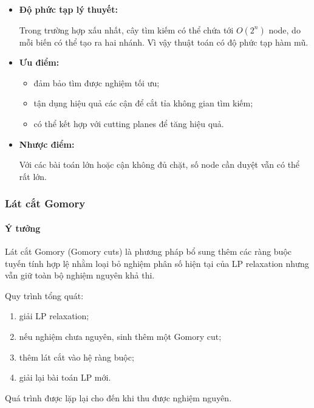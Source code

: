 \documentclass[fontsize=13pt,a4paper]{report}
\begin{document}
\begin{itemize}

  \item \textbf{Độ phức tạp lý thuyết:}

  Trong trường hợp xấu nhất, cây tìm kiếm có thể chứa tới \(O(2^n)\) node, do mỗi biến có thể tạo ra hai nhánh. Vì vậy thuật toán có độ phức tạp hàm mũ.

  \item \textbf{Ưu điểm:}

  \begin{itemize}
      \item đảm bảo tìm được nghiệm tối ưu;
      \item tận dụng hiệu quả các cận để cắt tỉa không gian tìm kiếm;
      \item có thể kết hợp với cutting planes để tăng hiệu quả.
  \end{itemize}

  \item \textbf{Nhược điểm:}

  Với các bài toán lớn hoặc cận không đủ chặt, số node cần duyệt vẫn có thể rất lớn.

\end{itemize}

\subsubsection{Lát cắt Gomory}

\paragraph{Ý tưởng}

Lát cắt Gomory (Gomory cuts) là phương pháp bổ sung thêm các ràng buộc tuyến tính hợp lệ nhằm loại bỏ nghiệm phân số hiện tại của LP relaxation nhưng vẫn giữ toàn bộ nghiệm nguyên khả thi.

Quy trình tổng quát:

\begin{enumerate}
    \item giải LP relaxation;
    \item nếu nghiệm chưa nguyên, sinh thêm một Gomory cut;
    \item thêm lát cắt vào hệ ràng buộc;
    \item giải lại bài toán LP mới.
\end{enumerate}

Quá trình được lặp lại cho đến khi thu được nghiệm nguyên.
\end{document}
